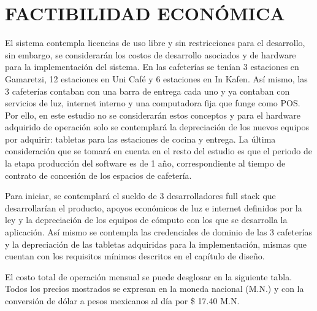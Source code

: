 \chapter{FACTIBILIDAD ECONÓMICA}
El sistema contempla licencias de uso libre y sin restricciones para el desarrollo, sin embargo, se considerarán los costos de desarrollo asociados y de hardware para la implementación del sistema. En las cafeterías se tenían 3 estaciones en Gamaretzi, 12 estaciones en Uni Café y 6 estaciones en In Kafen. Así mismo, las 3 cafeterías contaban con una barra de entrega cada uno y ya contaban con servicios de luz, internet interno y una computadora fija que funge como POS. Por ello, en este estudio no se considerarán estos conceptos y para el hardware adquirido de operación solo se contemplará la depreciación de los nuevos equipos por adquirir: tabletas para las estaciones de cocina y entrega. La última consideración que se tomará en cuenta en el resto del estudio es que el periodo de la etapa producción del software es de 1 año, correspondiente al tiempo de contrato de concesión de los espacios de cafetería.

Para iniciar, se contemplará el sueldo de 3 desarrolladores full stack que desarrollarían el producto, apoyos económicos de luz e internet definidos por la ley y la depreciación de los equipos de cómputo con los que se desarrolla la aplicación. Así mismo se contempla las credenciales de dominio de las 3 cafeterías y la depreciación de las tabletas adquiridas para la implementación, mismas que cuentan con los requisitos mínimos descritos en el capítulo de diseño.

El costo total de operación mensual se puede desglosar en la siguiente tabla. Todos los precios mostrados se expresan en la moneda nacional (M.N.) y con la conversión de dólar a pesos mexicanos al día por \$ 17.40 M.N.

\begingroup
\setlength{\LTleft}{\fill}
\setlength{\LTright}{\fill}

